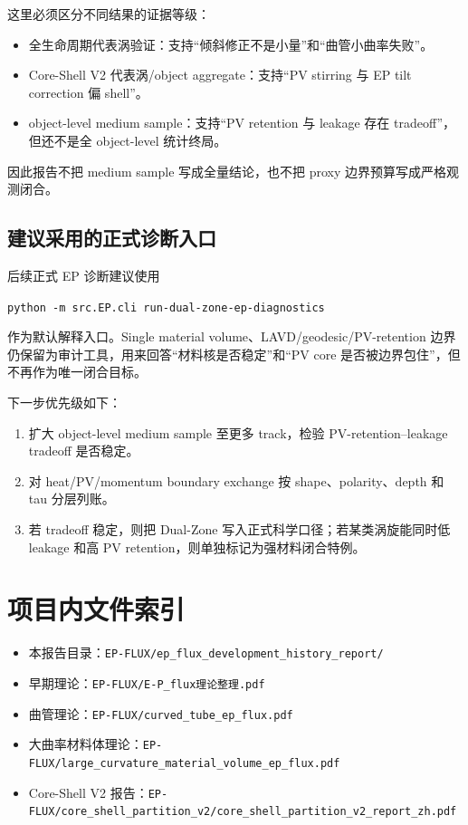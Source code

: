 \documentclass[11pt,a4paper]{ctexart}
\begin{document}
这里必须区分不同结果的证据等级：
\begin{itemize}
  \item 全生命周期代表涡验证：支持“倾斜修正不是小量”和“曲管小曲率失败”。
  \item Core-Shell V2 代表涡/object aggregate：支持“PV stirring 与 EP tilt correction 偏 shell”。
  \item object-level medium sample：支持“PV retention 与 leakage 存在 tradeoff”，但还不是全 object-level 统计终局。
\end{itemize}
因此报告不把 medium sample 写成全量结论，也不把 proxy 边界预算写成严格观测闭合。

\subsection{建议采用的正式诊断入口}

后续正式 EP 诊断建议使用
\begin{center}
\texttt{python -m src.EP.cli run-dual-zone-ep-diagnostics}
\end{center}
作为默认解释入口。Single material volume、LAVD/geodesic/PV-retention 边界仍保留为审计工具，用来回答“材料核是否稳定”和“PV core 是否被边界包住”，但不再作为唯一闭合目标。

下一步优先级如下：
\begin{enumerate}
  \item 扩大 object-level medium sample 至更多 track，检验 PV-retention--leakage tradeoff 是否稳定。
  \item 对 heat/PV/momentum boundary exchange 按 shape、polarity、depth 和 tau 分层列账。
  \item 若 tradeoff 稳定，则把 Dual-Zone 写入正式科学口径；若某类涡旋能同时低 leakage 和高 PV retention，则单独标记为强材料闭合特例。
\end{enumerate}

\section*{项目内文件索引}
\begin{itemize}
  \item 本报告目录：\texttt{EP-FLUX/ep\_flux\_development\_history\_report/}
  \item 早期理论：\texttt{EP-FLUX/E-P\_flux理论整理.pdf}
  \item 曲管理论：\texttt{EP-FLUX/curved\_tube\_ep\_flux.pdf}
  \item 大曲率材料体理论：\texttt{EP-FLUX/large\_curvature\_material\_volume\_ep\_flux.pdf}
  \item Core-Shell V2 报告：\texttt{EP-FLUX/core\_shell\_partition\_v2/core\_shell\_partition\_v2\_report\_zh.pdf}
\end{itemize}
\end{document}
